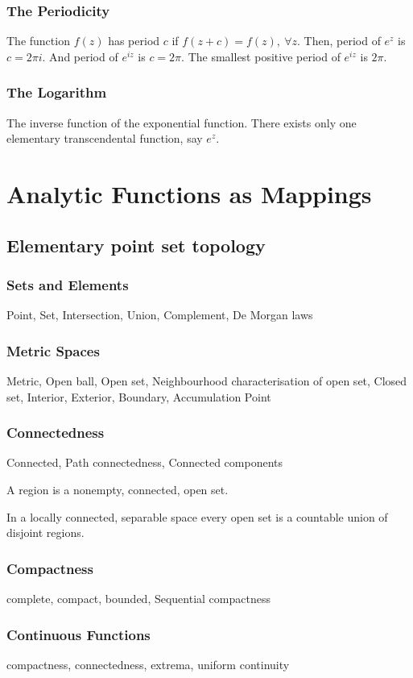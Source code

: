 \subsubsection{The Periodicity}
The function $f(z)$ has period $c$ if $f(z+c) = f(z),\ \forall z$.
Then, period of $e^{z}$ is $c = 2\pi i$.
And period of $e^{iz}$ is $c = 2\pi$.
The smallest positive period of $e^{iz}$ is $2\pi$.
\subsubsection{The Logarithm}
The inverse function of the exponential function.
There exists only one elementary transcendental function, say $e^z$.

\section{Analytic Functions as Mappings}
\subsection{Elementary point set topology}
\subsubsection{Sets and Elements}
Point, Set, Intersection, Union, Complement, De Morgan laws
\subsubsection{Metric Spaces}
Metric, Open ball, Open set, Neighbourhood characterisation of open set, Closed set, Interior, Exterior, Boundary, Accumulation Point
\subsubsection{Connectedness}
Connected, Path connectedness, Connected components
\begin{definition}
	A region is a nonempty, connected, open set.
\end{definition}
In a locally connected, separable space every open set is a countable union of disjoint regions.
\subsubsection{Compactness}
complete, compact, bounded, Sequential compactness
\subsubsection{Continuous Functions}
compactness, connectedness, extrema, uniform continuity
